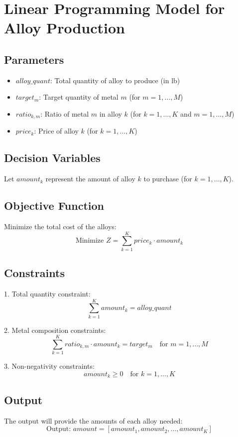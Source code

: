 \documentclass{article}
\begin{document}
\section*{Linear Programming Model for Alloy Production}

\subsection*{Parameters}
\begin{itemize}
    \item \( alloy\_quant \): Total quantity of alloy to produce (in lb)
    \item \( target_{m} \): Target quantity of metal \( m \) (for \( m = 1, \ldots, M \))
    \item \( ratio_{k,m} \): Ratio of metal \( m \) in alloy \( k \) (for \( k = 1, \ldots, K \) and \( m = 1, \ldots, M \))
    \item \( price_{k} \): Price of alloy \( k \) (for \( k = 1, \ldots, K \))
\end{itemize}

\subsection*{Decision Variables}
Let \( amount_{k} \) represent the amount of alloy \( k \) to purchase (for \( k = 1, \ldots, K \)).

\subsection*{Objective Function}
Minimize the total cost of the alloys:
\[
\text{Minimize } Z = \sum_{k=1}^{K} price_{k} \cdot amount_{k}
\]

\subsection*{Constraints}
1. Total quantity constraint:
\[
\sum_{k=1}^{K} amount_{k} = alloy\_quant
\]

2. Metal composition constraints:
\[
\sum_{k=1}^{K} ratio_{k,m} \cdot amount_{k} = target_{m} \quad \text{for } m = 1, \ldots, M
\]

3. Non-negativity constraints:
\[
amount_{k} \geq 0 \quad \text{for } k = 1, \ldots, K
\]

\subsection*{Output}
The output will provide the amounts of each alloy needed:
\[
\text{Output: } amount = [amount_{1}, amount_{2}, \ldots, amount_{K}]
\]
\end{document}
